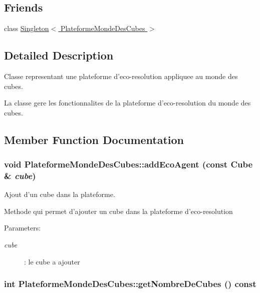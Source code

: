 \subsection*{Friends}
\begin{CompactItemize}
\item 
\hypertarget{classPlateformeMondeDesCubes_95609583990e9782a41cc432bdd2578d}{
class \hyperlink{classPlateformeMondeDesCubes_95609583990e9782a41cc432bdd2578d}{Singleton$<$ PlateformeMondeDesCubes $>$}}
\label{classPlateformeMondeDesCubes_95609583990e9782a41cc432bdd2578d}

\end{CompactItemize}


\subsection{Detailed Description}
Classe representant une plateforme d'eco-resolution appliquee au monde des cubes. 

La classe gere les fonctionnalites de la plateforme d'eco-resolution du monde des cubes. 

\subsection{Member Function Documentation}
\hypertarget{classPlateformeMondeDesCubes_0d16ae1a6181037c271456f0841cf63b}{
\subsubsection[{addEcoAgent}]{\setlength{\rightskip}{0pt plus 5cm}void PlateformeMondeDesCubes::addEcoAgent (const {\bf Cube} \& {\em cube})}}
\label{classPlateformeMondeDesCubes_0d16ae1a6181037c271456f0841cf63b}


Ajout d'un cube dans la plateforme. 

Methode qui permet d'ajouter un cube dans la plateforme d'eco-resolution

\begin{Desc}
\item[Parameters:]
\begin{description}
\item[{\em cube}]: le cube a ajouter \end{description}
\end{Desc}
\hypertarget{classPlateformeMondeDesCubes_a341731830c30c695d5ef80c90377165}{
\subsubsection[{getNombreDeCubes}]{\setlength{\rightskip}{0pt plus 5cm}int PlateformeMondeDesCubes::getNombreDeCubes () const}}
\label{classPlateformeMondeDesCubes_a341731830c30c695d5ef80c90377165}



